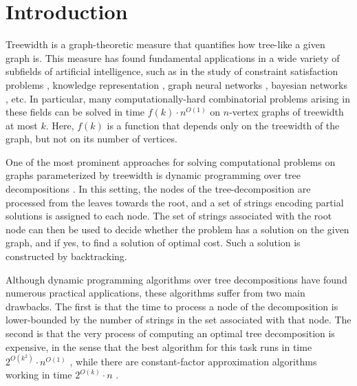 \section{Introduction}
Treewidth is a graph-theoretic measure that quantifies how tree-like a given graph is. This measure has found fundamental applications in a wide variety of subfields of artificial intelligence, such as in the study of constraint satisfaction problems \cite{dalmau2002constraint,samer2010constraint}, knowledge representation \cite{gottlob2010bounded}, graph neural networks \cite{barcelo2021graph}, bayesian networks \cite{elidan2008learning}, etc. In particular, many computationally-hard combinatorial problems arising in these fields can be solved in time $f(k)\cdot n^{O(1)}$ on $n$-vertex graphs of treewidth at most $k$. Here, $f(k)$ is a function that depends only on the treewidth of the graph, but not on its number of vertices. 

One of the most prominent approaches for solving computational problems on graphs parameterized by treewidth is dynamic programming over tree decompositions \cite{Baste2022,From2023,hagerup2000dynamic}. In this setting, the nodes of the tree-decomposition are processed from the leaves towards the root, and a set of strings encoding partial solutions is assigned to each node. The set of strings associated with the root node can then be used to decide whether the problem has a solution on the given graph, and if yes, to find a solution of optimal cost. Such a solution is constructed by backtracking. 

Although dynamic programming algorithms over tree decompositions have found numerous practical applications, these algorithms suffer from two main drawbacks. The first is that the time to process a node of the decomposition is lower-bounded by the number of strings in the set associated with that node. The second is that the very process of computing an optimal tree decomposition is expensive, in the sense that the best algorithm for this task runs in time $2^{O(k^2)}\cdot n^{O(1)}$ \cite{korhonen2023improved}, while there are constant-factor approximation algorithms working in time $2^{O(k)}\cdot n$ \cite{korhonen2023single}. 

